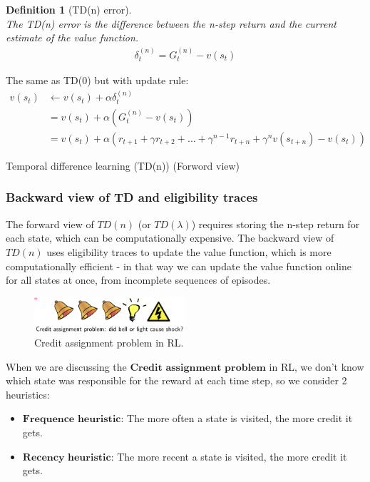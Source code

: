 \documentclass[11pt]{book} %
\newtheorem{definition}{Definition}[section]
\begin{document}
\begin{definition}[TD(n) error]\ \\
    The TD(n) error is the difference between the n-step return and the current estimate of the value function.
    \begin{align*}
        \delta_t^{(n)} = G_t^{(n)} - v(s_t)
    \end{align*}
\end{definition}

\begin{algorithm}[H]
    \SetAlgoLined
        The same as TD(0) but with update rule: 
        \begin{align*}
            v(s_t) &\leftarrow v(s_t) + \alpha \delta_t^{(n)} \\ 
            &= v(s_t) + \alpha (G_t^{(n)} - v(s_t)) \\ 
            &= v(s_t) + \alpha (r_{t+1} + \gamma r_{t+2} + \ldots + \gamma^{n-1} r_{t+n} + \gamma^n v(s_{t+n}) - v(s_t))
        \end{align*}
    \caption{Temporal difference learning (TD(n)) (Forword view) \label{Temporal difference learning}}
\end{algorithm}

\subsubsection{Backward view of TD and eligibility traces}
The forward view of $TD(n)$ (or $TD(\lambda)$) requires storing the n-step return for each state, which can be computationally expensive.
The backward view of $TD(n)$ uses eligibility traces to update the value function, which is more computationally efficient - 
in that way we can update the value function online for all states at once, from incomplete sequences of episodes.


\begin{figure}[ht]
    \centering
    \includegraphics[width=0.5\textwidth]{./Figs/RL_credit_assignment.png}
    \caption{Credit assignment problem in RL.}
    \label{fig:eligibility_traces}
\end{figure}

When we are discussing the $\textbf{Credit assignment problem}$ in RL, we don't know which state was responsible for the reward at each time step,
so we consider 2 heuristics:
\begin{itemize}
    \item $\textbf{Frequence heuristic}$: The more often a state is visited, the more credit it gets.
    \item $\textbf{Recency heuristic}$: The more recent a state is visited, the more credit it gets.
\end{itemize}
\end{document}
